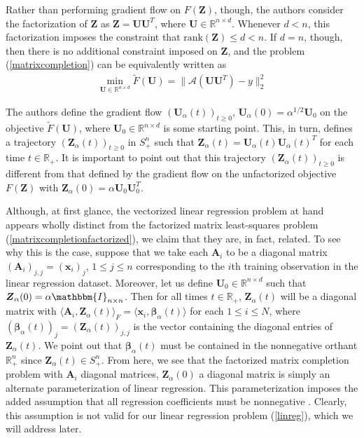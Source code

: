 \documentclass{article}
\begin{document}
Rather than performing gradient flow on $F(\boldsymbol{Z})$, though, the authors consider the factorization of $\boldsymbol{Z}$ as $\boldsymbol{Z} = \boldsymbol{U}\boldsymbol{U}^T$, where $\boldsymbol{U} \in \mathbb{R}^{n \times d}$. Whenever $d < n$, this factorization imposes the constraint that $\text{rank}(\boldsymbol{Z}) \leq d < n$. If $d=n$, though, then there is no additional constraint imposed on $\boldsymbol{Z}$, and the problem (\ref{matrixcompletion}) can be equivalently written as
\begin{align}\label{matrixcompletionfactorized}
    \min_{\boldsymbol{U} \in \mathbb{R}^{n \times d}} \widetilde{F}(\boldsymbol{U}) = \| \mathcal{A}(\boldsymbol{U}\boldsymbol{U}^T) - y \|_2^2
\end{align}

The authors define the gradient flow $(\boldsymbol{U}_{\alpha}(t))_{t \geq 0}$, $\boldsymbol{U}_{\alpha}(0) = \alpha^{1/2} \boldsymbol{U}_0$ on the objective $\widetilde{F}(\boldsymbol{U})$, where $\boldsymbol{U}_0 \in \mathbb{R}^{n \times d}$ is some starting point. This, in turn, defines a trajectory $(\boldsymbol{Z}_{\alpha}(t))_{t \geq 0}$ in $S_+^n$ such that $\boldsymbol{Z}_{\alpha}(t) = \boldsymbol{U}_{\alpha}(t)\boldsymbol{U}_{\alpha}(t)^T$ for each time $t \in \mathbb{R}_+$. It is important to point out that this trajectory $(\boldsymbol{Z}_{\alpha}(t))_{t \geq 0}$ is different from that defined by the gradient flow on the unfactorized objective $F(\boldsymbol{Z})$ with $\boldsymbol{Z}_{\alpha}(0) = \alpha \boldsymbol{U}_0\boldsymbol{U}_0^T$.

Although, at first glance, the vectorized linear regression problem at hand appears wholly distinct from the factorized matrix least-squares problem (\ref{matrixcompletionfactorized}), we claim that they are, in fact, related. To see why this is the case, suppose that we take each $\boldsymbol{A}_i$ to be a diagonal matrix $(\boldsymbol{A}_i)_{j,j} = (\boldsymbol{x}_i)_j$, $1 \leq j \leq n$ corresponding to the $i$th training observation in the linear regression dataset. Moreover, let us define $\boldsymbol{U}_0 \in \mathbb{R}^{n \times d}$ such that $\boldsymbol{Z}_{\alpha}(0) = \alpha\mathbbm{I}_{n \times n}$. Then for all times $t \in \mathbb{R}_+$, $\boldsymbol{Z}_{\alpha}(t)$ will be a diagonal matrix with $\langle \boldsymbol{A}_i, \boldsymbol{Z}_{\alpha}(t) \rangle_F = \langle \boldsymbol{x}_i, \boldsymbol{\beta}_{\alpha}(t) \rangle$ for each $1 \leq i \leq N$, where $(\boldsymbol{\beta}_{\alpha}(t))_j = (\boldsymbol{Z}_{\alpha}(t))_{j,j}$ is the vector containing the diagonal entries of $\boldsymbol{Z}_{\alpha}(t)$. We point out that $\boldsymbol{\beta}_{\alpha}(t)$ must be contained in the nonnegative orthant $\mathbb{R}_+^n$ since $\boldsymbol{Z}_{\alpha}(t) \in S_+^n$. From here, we see that the factorized matrix completion problem with $\boldsymbol{A}_i$ diagonal matrices, $\boldsymbol{Z}_{\alpha}(0)$ a diagonal matrix is simply an alternate parameterization of linear regression. This parameterization imposes the added assumption that all regression coefficients must be nonnegative \cite{gunasekar2018implicit}. Clearly, this assumption is not valid for our linear regression problem (\ref{linreg}), which we will address later.
\end{document}
